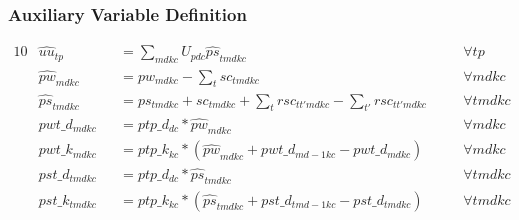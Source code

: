 \subsubsection{Auxiliary Variable Definition}
\label{auxiliary constraints}
\begin{alignat}{10}
	& \hat{uu}_{tp} 
		&& =  \sum_{mdkc} U_{pdc} \hat{ps}_{tmdkc} \quad
		&& \forall tp \\ 
	& \hat{pw}_{mdkc} 
		&& = pw_{mdkc} - \sum_{t} sc_{tmdkc} \quad 
		&& \forall mdkc \\ 
	& \hat{ps}_{tmdkc} 
		&& = ps_{tmdkc} + sc_{tmdkc} + 
		\sum_{t} rsc_{tt'mdkc} - \sum_{t'} rsc_{tt'mdkc} \quad 
		&& \forall tmdkc \\
	& pwt\_d_{mdkc} 
		&& = ptp\_d_{dc} * \hat{pw}_{mdkc} \quad
		&& \forall mdkc \\
	& pwt\_k_{mdkc} 
		&& = ptp\_k_{kc} * ( \hat{pw}_{mdkc} + pwt\_d_{md-1kc} - pwt\_d_{mdkc} )  \quad
		&& \forall mdkc \\
	& pst\_d_{tmdkc} 
		&& = ptp\_d_{dc} * \hat{ps}_{tmdkc} \quad
		&& \forall tmdkc \\
	& pst\_k_{tmdkc} 
		&& = ptp\_k_{kc} * ( \hat{ps}_{tmdkc} + pst\_d_{tmd-1kc} - pst\_d_{tmdkc} )  \quad
		&& \forall tmdkc
\end{alignat}

